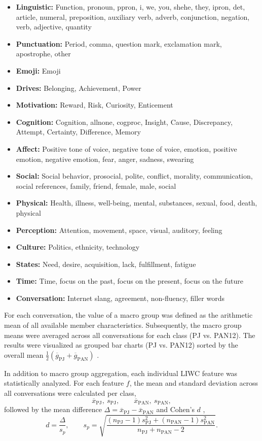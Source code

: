 \begin{itemize}
    \item \textbf{Linguistic:} Function, pronoun, ppron, i, we, you, shehe, they, ipron, det, article, numeral, preposition, auxiliary verb, adverb, conjunction, negation, verb, adjective, quantity
    \item \textbf{Punctuation:} Period, comma, question mark, exclamation mark, apostrophe, other
    \item \textbf{Emoji:} Emoji
    \item \textbf{Drives:} Belonging, Achievement, Power
    \item \textbf{Motivation:} Reward, Risk, Curiosity, Enticement
    \item \textbf{Cognition:} Cognition, allnone, cogproc, Insight, Cause, Discrepancy, Attempt, Certainty, Difference, Memory
    \item \textbf{Affect:} Positive tone of voice, negative tone of voice, emotion, positive emotion, negative emotion, fear, anger, sadness, swearing
    \item \textbf{Social:} Social behavior, prosocial, polite, conflict, morality, communication, social references, family, friend, female, male, social
    \item \textbf{Physical:} Health, illness, well-being, mental, substances, sexual, food, death, physical
    \item \textbf{Perception:} Attention, movement, space, visual, auditory, feeling
    \item \textbf{Culture:} Politics, ethnicity, technology
    \item \textbf{States:} Need, desire, acquisition, lack, fulfillment, fatigue
    \item \textbf{Time:} Time, focus on the past, focus on the present, focus on the future
    \item \textbf{Conversation:} Internet slang, agreement, non-fluency, filler words
\end{itemize}

For each conversation, the value of a macro group was defined as the arithmetic mean of all available member characteristics. Subsequently, the macro group means were averaged across all conversations for each class (PJ vs. PAN12). 
The results were visualized as grouped bar charts (PJ vs. PAN12) sorted by the overall mean \(\tfrac{1}{2}(\overline{g}_{\mathrm{PJ}}+\overline{g}_{\mathrm{PAN}})\) .

In addition to macro group aggregation, each individual LIWC feature was statistically analyzed. For each feature \(f\), the mean and standard deviation across all conversations were calculated per class,
\[
\overline{x}_{\mathrm{PJ}},\ s_{\mathrm{PJ}},
\qquad
\overline{x}_{\mathrm{PAN}},\ s_{\mathrm{PAN}},
\]
followed by the mean difference \(\Delta = \overline{x}_{\mathrm{PJ}} - \overline{x}_{\mathrm{PAN}}\) and Cohen's \(d\) \cite{cohen1988},
\[
d = \frac{\Delta}{s_p},
\qquad
s_p = \sqrt{\frac{(n_{\mathrm{PJ}}-1)s_{\mathrm{PJ}}^2+(n_{\mathrm{PAN}}-1)s_{\mathrm{PAN}}^2}{n_{\mathrm{PJ}}+n_{\mathrm{PAN}}-2}}.
\]


